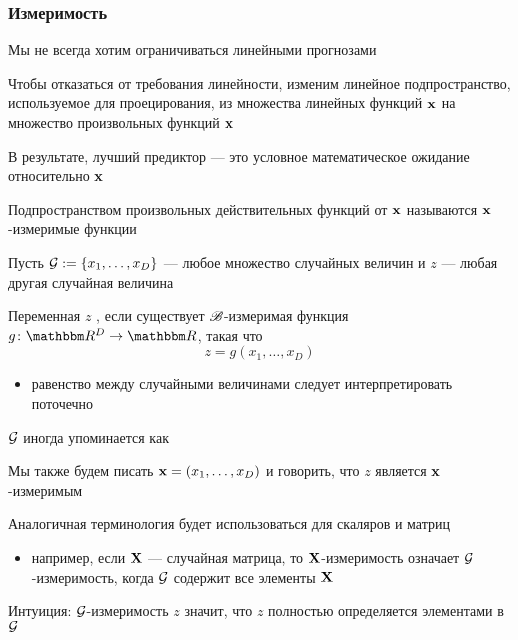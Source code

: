 \begin{frame}\frametitle{Измеримость}

    \vspace{2em}
    Мы не всегда хотим ограничиваться линейными прогнозами
    
    Чтобы отказаться от требования линейности, изменим линейное подпространство, используемое для 
    проецирования, из множества линейных функций ${\mathbf x}$ на множество произвольных функций
    ${\mathbf x}$
    
    В результате, лучший предиктор --- это условное математическое ожидание относительно ${\mathbf x}$

\end{frame}

\begin{frame}
    
    \vspace{2em}
    Подпространством произвольных действительных функций от
    ${\mathbf x}$ называются ${\mathbf x}$-измеримые функции

    Пусть $\mathcal G := \{x_1, \ldots, x_D\}$ --- любое множество случайных величин
    и $z$ --- любая другая случайная величина
    
    Переменная $z$ , если
    существует $\mathscr B$-измеримая функция $g \colon \RR^D \to \RR$, такая что
    \begin{equation*}
        \label{eq:gmeas}
        z = g(x_1, \ldots, x_D)
    \end{equation*}
    \begin{itemize}
        \item равенство между случайными величинами следует интерпретировать поточечно
    \end{itemize}
    
\end{frame}

\begin{frame}

    \vspace{2em}
    $\mathcal G$ иногда упоминается как 
    
    Мы также будем писать ${\mathbf x} = (x_1, \ldots, x_D)$ и говорить, что
    $z$ является ${\mathbf x}$-измеримым
    
    Аналогичная терминология будет использоваться для скаляров и матриц
    \begin{itemize}
        \item например, если $\mathbf X$ --- случайная матрица, то
        $\mathbf X$-измеримость означает $\mathcal G$-измеримость, когда $\mathcal G$ содержит все элементы $\mathbf X$
    \end{itemize}
    
    \vspace{1em}
    Интуиция: $\mathcal G$-измеримость $z$ значит, что $z$ полностью определяется элементами в $\mathcal G$
    
\end{frame}

